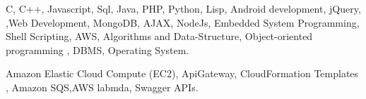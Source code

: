 



\begin{cventries}

\cvproject
{
    \begin{cvitems} %
        \item {C, C++, Javascript, Sql, Java, PHP, Python, Lisp, Android development, jQuery, ,Web Development, MongoDB, AJAX, NodeJs, Embedded System Programming, Shell Scripting, AWS, Algorithms and Data-Structure, Object-oriented programming , DBMS, Operating System.}
        \item { Amazon Elastic Cloud Compute (EC2), ApiGateway, CloudFormation Templates , Amazon SQS,AWS labmda, Swagger APIs. }
        \end{cvitems}
}

\end{cventries}